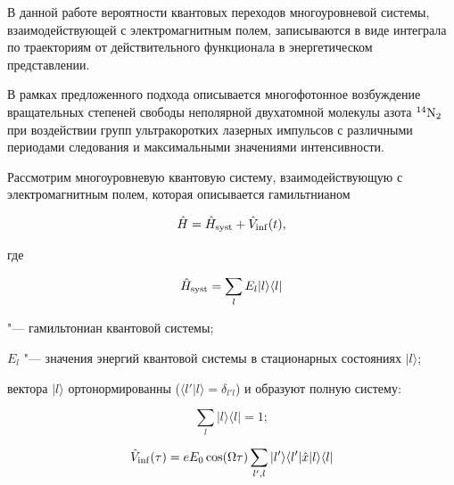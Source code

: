 В данной работе вероятности квантовых переходов многоуровневой системы, взаимодействующей с электромагнитным полем, записываются в виде интеграла по траекториям от действительного функционала в энергетическом представлении. 



В рамках предложенного подхода \cite{biruk:BirShlem, biruk:BirShlemEn} описывается многофотонное возбуждение вращательных степеней свободы неполярной двухатомной молекулы азота $^{14}\rm N_2$ при воздействии групп ультракоротких лазерных импульсов с различными периодами следования и максимальными значениями интенсивности.



\smallskip




Рассмотрим многоуровневую квантовую систему, взаимодействующую с электромагнитным полем, которая описывается гамильтнианом

\begin{equation}

\hat{H}=\hat{H}_{\rm syst}+\hat{V}_{\rm inf}(t),

\label{biruk:1}

\end{equation}

где

\begin{equation}

\hat{H}_{\rm syst}=\sum\limits_{l} E_{l} |l\rangle \langle l|

\label{biruk:2}

\end{equation}

"--- гамильтониан квантовой системы; 

$E_{l}$ "--- значения энергий квантовой системы в стационарных состояниях $|l\rangle$; 

вектора $|l\rangle$  ортонормированны ($\langle l'|l\rangle=\delta_{l'l}$) и образуют полную систему: 

$$

\sum\limits_{l}|l\rangle\langle l|=1;

$$

\begin{equation}

\hat{V}_{\rm inf}(\tau)=e E_0 \cos(\Omega \tau) \sum\limits_{l',l} |l'\rangle \langle l'| \hat{x} |l\rangle \langle l| 

\label{biruk:3}

\end{equation}

